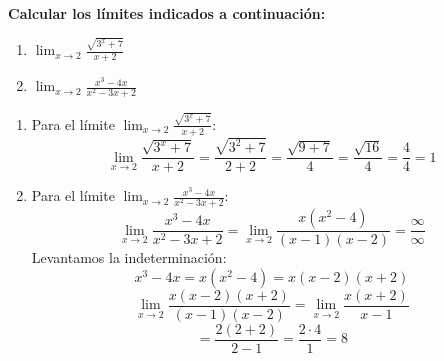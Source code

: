 \documentclass[answers]{exam}
\begin{document}
\begin{questions}
	\vspace{0.5cm}

	\question \large\textbf{Calcular los límites indicados a continuación:}
	\begin{enumerate}[label=\alph*.]
		\item $\displaystyle \lim_{x\to{2}} \frac{\sqrt{3^x+7}}{x+2}$
		\item $\displaystyle \lim_{x\to{2}} \frac{x^3-4x}{x^2-3x+2}$
	\end{enumerate}
	\vspace{0.5cm}
	\begin{solution}
		\begin{enumerate}[label=\alph*.]
			\item Para el límite $\displaystyle \lim_{x\to{2}} \frac{\sqrt{3^x+7}}{x+2}$:
			      \[
				      \lim_{x \to 2} \frac{\sqrt{3^x+7}}{x+2} = \frac{\sqrt{3^2+7}}{2+2} = \frac{\sqrt{9+7}}{4} = \frac{\sqrt{16}}{4} = \frac{4}{4} = 1
			      \]

			\item Para el límite $\displaystyle \lim_{x\to{2}} \frac{x^3-4x}{x^2-3x+2}$:
			      \[
				      \lim_{x \to 2} \frac{x^3-4x}{x^2-3x+2} = \lim_{x \to 2} \frac{x(x^2-4)}{(x-1)(x-2)}= \frac{\infty}{\infty}
			      \]
			      Levantamos la indeterminación:
			      \[
				      x^3-4x = x(x^2-4) = x(x-2)(x+2)
			      \]
			      \[
				      \lim_{x \to 2} \frac{x(x-2)(x+2)}{(x-1)(x-2)} = \lim_{x \to 2} \frac{x(x+2)}{x-1}
			      \]
			      \vspace{0.1cm}
			      \[
				      = \frac{2(2+2)}{2-1} = \frac{2 \cdot 4}{1} = 8
			      \]
		\end{enumerate}
	\end{solution}

	\vspace{0.5cm}

\end{questions}
\end{document}
